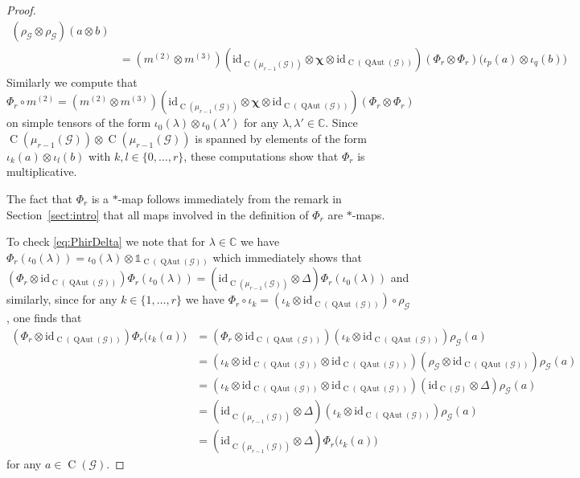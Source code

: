 \documentclass[11pt,reqno]{amsart}
\newcommand{\id}{\mathrm{id}}
\newcommand{\I}{\mathds{1}}
\newcommand{\comp}{\circ}
\newcommand{\tens}{\otimes}
\newcommand{\flip}{\boldsymbol{\chi}}
\newcommand{\CC}{\mathbb{C}}
\DeclareMathOperator{\QAut}{QAut}
\DeclareMathOperator{\C}{C}
\begin{document}
\begin{proof}
\[{{\begin{aligned}
(\rho_{\scriptscriptstyle\mathcal{G}}\tens\rho_{\scriptscriptstyle\mathcal{G}})(a\tens b)\\
&=(m^{(2)}\tens m^{(3)})
(\id_{\C(\mu_{r-1}(\mathcal{G}))}\tens\flip\tens\id_{\C(\QAut(\mathcal{G}))})
(\Phi_r\tens\Phi_r)\bigl(\iota_p(a)\tens\iota_q(b)\bigr)
\end{aligned}
}}
\]
Similarly we compute that $\Phi_r\comp m^{(2)}=(m^{(2)}\tens m^{(3)})
(\id_{\C(\mu_{r-1}(\mathcal{G}))}\tens\flip\tens\id_{\C(\QAut(\mathcal{G}))})
(\Phi_r\tens\Phi_r)$ on simple tensors of the form $\iota_0(\lambda)\tens\iota_0(\lambda')$ for any $\lambda,\lambda'\in\CC$. Since $\C(\mu_{r-1}(\mathcal{G}))\tens\C(\mu_{r-1}(\mathcal{G}))$ is spanned by elements of the form $\iota_k(a)\tens\iota_l(b)$ with $k,l\in\{0,\dotsc,r\}$, these computations show that $\Phi_r$ is multiplicative.

The fact that $\Phi_r$ is a $*$-map follows immediately from the remark in Section~\ref{sect:intro} that all maps involved in the definition of $\Phi_r$ are $*$-maps.

To check \eqref{eq:PhirDelta} we note that for $\lambda\in\CC$ we have $\Phi_r(\iota_0(\lambda))=\iota_0(\lambda)\tens\I_{\C(\QAut(\mathcal{G}))}$ which immediately shows that $(\Phi_r\tens\id_{\C(\QAut(\mathcal{G}))})\Phi_r(\iota_0(\lambda))=(\id_{\C(\mu_{r-1}(\mathcal{G}))}\tens\Delta)\Phi_r(\iota_0(\lambda))$ and similarly, since for any $k\in\{1,\dotsc,r\}$ we have $\Phi_r\comp\iota_k=(\iota_k\tens\id_{\C(\QAut(\mathcal{G}))})\comp\rho_{\scriptscriptstyle\mathcal{G}}$, one finds that
\begin{align*}
(\Phi_r\tens\id_{\C(\QAut(\mathcal{G}))})\Phi_r\bigl(\iota_k(a)\bigr)
&=(\Phi_r\tens\id_{\C(\QAut(\mathcal{G}))})(\iota_k\tens\id_{\C(\QAut(\mathcal{G}))})\rho_{\scriptscriptstyle\mathcal{G}}(a)\\
&=(\iota_k\tens\id_{\C(\QAut(\mathcal{G}))}\tens\id_{\C(\QAut(\mathcal{G}))})(\rho_{\scriptscriptstyle\mathcal{G}}\tens\id_{\C(\QAut(\mathcal{G}))})\rho_{\scriptscriptstyle\mathcal{G}}(a)\\
&=(\iota_k\tens\id_{\C(\QAut(\mathcal{G}))}\tens\id_{\C(\QAut(\mathcal{G}))})(\id_{\C(\mathcal{G})}\tens\Delta)\rho_{\scriptscriptstyle\mathcal{G}}(a)\\
&=(\id_{\C(\mu_{r-1}(\mathcal{G}))}\tens\Delta)(\iota_k\tens\id_{\C(\QAut(\mathcal{G}))})\rho_{\scriptscriptstyle\mathcal{G}}(a)\\
&=(\id_{\C(\mu_{r-1}(\mathcal{G}))}\tens\Delta)\Phi_r\bigl(\iota_k(a)\bigr)
\end{align*}
for any $a\in\C(\mathcal{G})$.


\end{proof}
\end{document}
